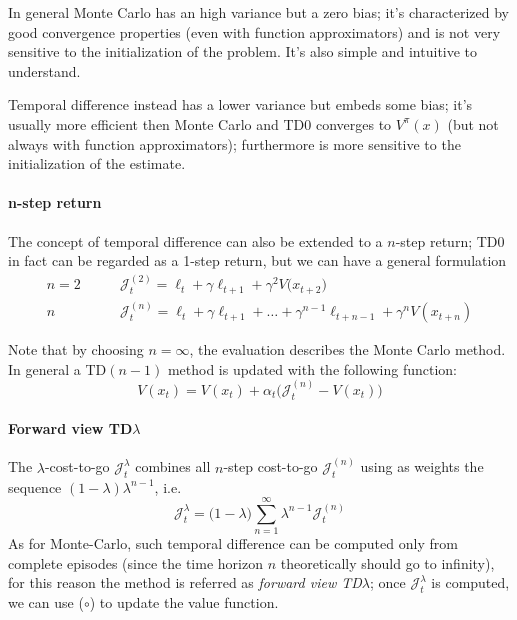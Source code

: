 	In general Monte Carlo has an high variance but a zero bias; it's characterized by good convergence properties (even with function approximators) and is not very sensitive to the initialization of the problem. It's also simple and intuitive to understand. 
	
	Temporal difference instead has a lower variance but embeds some bias; it's usually more efficient then Monte Carlo and TD0 converges to $V^\pi(x)$ (but not always with function approximators); furthermore is more sensitive to the initialization of the estimate.
	
	\paragraph{n-step return} The concept of temporal difference can also be extended to a $n$-step return; TD0 in fact can be regarded as a 1-step return, but we can have a general formulation
	\begin{align*}
		n  = 2 &  \qquad \mathcal J_t^{(2)} = \ell_t + \gamma \ell_{t+1} + \gamma^2 V\big(x_{t+2}\big) \\ 
		n & \qquad \mathcal J_t^{(n)} = \ell_t + \gamma \ell_{t+1} + \dots + \gamma^{n-1} \ell_{t+n-1} + \gamma^n V(x_{t+n})
	\end{align*}
	
	Note that by choosing $n = \infty$, the evaluation describes the Monte Carlo method. In general a TD$(n-1)$ method is updated with the following function:
	\[ V(x_t) = V(x_t) + \alpha_t\big(\mathcal J_t^{(n)} - V(x_t)\big) \tag{$\circ$} \]
	
	\paragraph{Forward view TD$\lambda$} The $\lambda$-cost-to-go $\mathcal J_t^\lambda$ combines all $n$-step cost-to-go $\mathcal J_t^{(n)}$ using as weights the sequence $(1-\lambda)\lambda^{n-1}$, i.e.
	\begin{equation}
		\mathcal J_t^\lambda = \big(1-\lambda\big) \sum_{n=1}^\infty \lambda^{n-1} \mathcal J_t^{(n)}		
	\end{equation}
	As for Monte-Carlo, such temporal difference can be computed only from complete episodes (since the time horizon $n$ theoretically should go to infinity), for this reason the method is referred as \textit{forward view TD$\lambda$}; once $\mathcal J_t^\lambda$ is computed, we can use ($\circ$) to update the value function.
	
